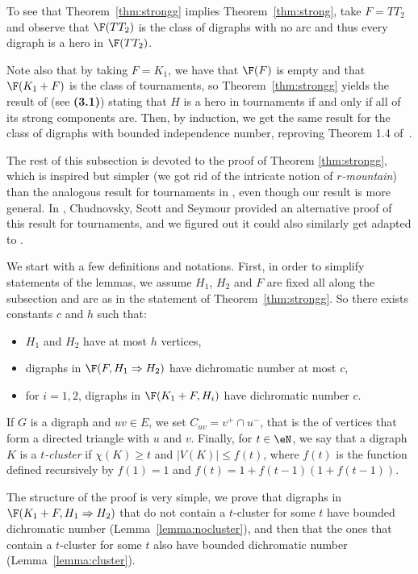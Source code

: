 To see that Theorem~\ref{thm:strongg} implies Theorem~\ref{thm:strong}, take $F=TT_2$ and observe that $\F( TT_2)$ is the class of digraphs with no arc and thus every digraph is a hero in $\F( TT_2)$.

Note also that by taking $F=K_1$, we have that $\F( F)$ is empty and that $\F( K_1+F)$ is the class of tournaments, so Theorem~\ref{thm:strongg} yields the result of \cite{hero} (see \textbf{(3.1)}) stating that $H$ is a hero in tournaments if and only if all of its strong components are. Then, by induction, we get the same result for the class of digraphs with bounded independence number, reproving Theorem 1.4 of~\cite{HLNT19}. 
\medskip


The rest of this subsection is devoted to the proof of Theorem \ref{thm:strongg}, which is inspired but simpler (we got rid of the intricate notion of \emph{$r$-mountain}) than the analogous result for tournaments in \cite{hero}, even though our result is more general. In \cite{CSS14}, Chudnovsky, Scott and Seymour provided an alternative proof of this result for tournaments, and we figured out it could also similarly get adapted to \omgs.


We start with a few definitions and notations. First, in order to simplify statements of the lemmas, we assume $H_1$, $H_2$ and $F$ are fixed all along the subsection and are as in the statement of Theorem~\ref{thm:strongg}. So there exists constants $c$ and $h$ such that:
\begin{itemize}
\item $H_1$ and $H_2$ have at most $h$ vertices,
\item digraphs in $\F( F, H_{1} \Rightarrow H_{2})$ have dichromatic number at most $c$, %
\item for $i=1,2$, digraphs in $\F( K_1+F, H_i)$ have dichromatic number $c$. %
\end{itemize}

If $G$ is a digraph and $uv \in E$, we set $C_{uv} =v^+ \cap u^-$, that is the of vertices that form a directed triangle with $u$ and $v$. Finally, for $t\in \eN$, we say that a digraph $K$ is a \emph{$t$-cluster} if $\chi(K)\geq t$ and $|V(K)|\leq f(t)$, where $f(t)$ is the function defined recursively by $f(1)=1$ and $f(t)=1+f(t-1)(1+f(t-1))$.

The structure of the proof is very simple, we prove that digraphs in $\F( K_1+F, H_{1} \Rightarrow H_{2})$ that do not contain a $t$-cluster for some $t$ have bounded dichromatic number (Lemma~\ref{lemma:nocluster}), and then that the ones that contain a $t$-cluster for some $t$ also have bounded dichromatic number (Lemma~\ref{lemma:cluster}). 

